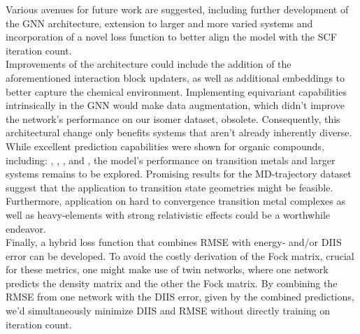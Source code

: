 Various avenues for future work are suggested, including further development of the GNN architecture, extension to larger and more varied systems and incorporation of a novel loss function to better align the model with the SCF iteration count. \\
Improvements of the architecture could include the addition of the aforementioned interaction block updaters, as well as additional embeddings to better capture the chemical environment. Implementing equivariant capabilities intrinsically in the GNN would make data augmentation, which didn't improve the network's performance on our isomer dataset, obsolete. Consequently, this architectural change only benefits systems that aren't already inherently diverse.  \\
While excellent prediction capabilities were shown for organic compounds, including: , , ,  and , the model's performance on transition metals and larger systems remains to be explored. Promising results for the MD-trajectory dataset suggest that the application to transition state geometries might be feasible.
Furthermore, application on hard to convergence transition metal complexes as well as heavy-elements with strong relativistic effects could be a worthwhile endeavor. \\
Finally, a hybrid loss function that combines RMSE with energy- and/or DIIS error can be developed. To avoid the costly derivation of the Fock matrix, crucial for these metrics, one might make use of twin networks, where one network predicts the density matrix and the other the Fock matrix. By combining the RMSE from one network with the DIIS error, given by the combined predictions, we'd simultaneously minimize DIIS and RMSE without directly training on iteration count.
